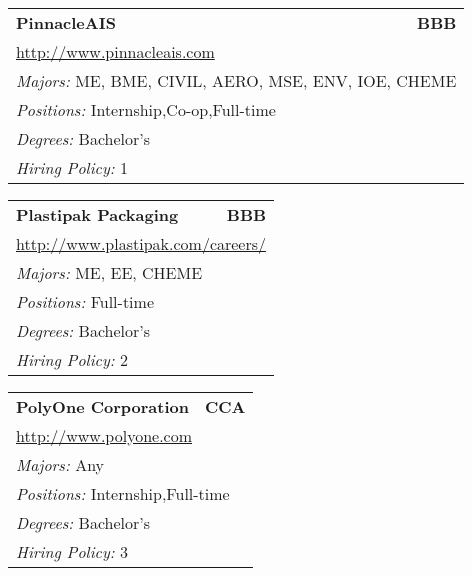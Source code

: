 \documentclass[twoside]{article}
\begin{document}
\begin{center}
\begin{multicols}{3}
\begin{FlushLeft}
\begin{minipage}{.9\columnwidth}
\end{minipage}
 
\begin{minipage}{.9\columnwidth}\begin{tabularx}{.95\columnwidth}{Xr}
                 {\Large\bf PinnacleAIS} & {\Large\bf BBB}\\
    \multicolumn{2}{p{.95\columnwidth}}{\url{http://www.pinnacleais.com}}\\
    \multicolumn{2}{p{.95\columnwidth}}{\emph{Majors:} ME, BME, CIVIL, AERO, MSE, ENV, IOE, CHEME}\\
    \multicolumn{2}{p{.95\columnwidth}}{\emph{Positions:} Internship,Co-op,Full-time}\\
    \multicolumn{2}{p{.95\columnwidth}}{\emph{Degrees:} Bachelor's}\\
    \multicolumn{2}{p{.95\columnwidth}}{\emph{Hiring Policy:} 1}\\
    \end{tabularx}
    
\end{minipage}
 
\begin{minipage}{.9\columnwidth}\begin{tabularx}{.95\columnwidth}{Xr}
                 {\Large\bf Plastipak Packaging} & {\Large\bf BBB}\\
    \multicolumn{2}{p{.95\columnwidth}}{\url{http://www.plastipak.com/careers/}}\\
    \multicolumn{2}{p{.95\columnwidth}}{\emph{Majors:} ME, EE, CHEME}\\
    \multicolumn{2}{p{.95\columnwidth}}{\emph{Positions:} Full-time}\\
    \multicolumn{2}{p{.95\columnwidth}}{\emph{Degrees:} Bachelor's}\\
    \multicolumn{2}{p{.95\columnwidth}}{\emph{Hiring Policy:} 2}\\
    \end{tabularx}
    
\end{minipage}
 
\begin{minipage}{.9\columnwidth}\begin{tabularx}{.95\columnwidth}{Xr}
                 {\Large\bf PolyOne Corporation} & {\Large\bf CCA}\\
    \multicolumn{2}{p{.95\columnwidth}}{\url{http://www.polyone.com}}\\
    \multicolumn{2}{p{.95\columnwidth}}{\emph{Majors:} Any}\\
    \multicolumn{2}{p{.95\columnwidth}}{\emph{Positions:} Internship,Full-time}\\
    \multicolumn{2}{p{.95\columnwidth}}{\emph{Degrees:} Bachelor's}\\
    \multicolumn{2}{p{.95\columnwidth}}{\emph{Hiring Policy:} 3}\\
    \end{tabularx}
    

\end{minipage}
\end{FlushLeft}
\end{multicols}
\end{center}
\end{document}
